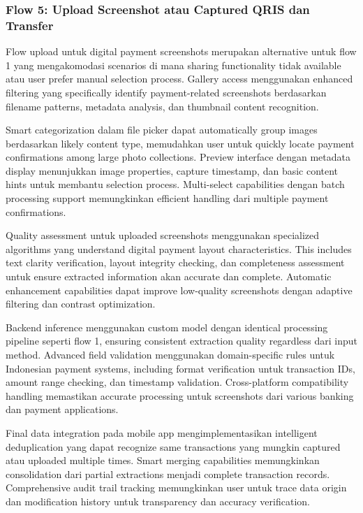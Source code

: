 \subsubsection{Flow 5: Upload Screenshot atau Captured QRIS dan Transfer}
\label{subsubsec:flow-upload-digital}

Flow upload untuk digital payment screenshots merupakan alternative untuk flow 1 yang mengakomodasi scenarios di mana sharing functionality tidak available atau user prefer manual selection process. Gallery access menggunakan enhanced filtering yang specifically identify payment-related screenshots berdasarkan filename patterns, metadata analysis, dan thumbnail content recognition.

Smart categorization dalam file picker dapat automatically group images berdasarkan likely content type, memudahkan user untuk quickly locate payment confirmations among large photo collections. Preview interface dengan metadata display menunjukkan image properties, capture timestamp, dan basic content hints untuk membantu selection process. Multi-select capabilities dengan batch processing support memungkinkan efficient handling dari multiple payment confirmations.

Quality assessment untuk uploaded screenshots menggunakan specialized algorithms yang understand digital payment layout characteristics. This includes text clarity verification, layout integrity checking, dan completeness assessment untuk ensure extracted information akan accurate dan complete. Automatic enhancement capabilities dapat improve low-quality screenshots dengan adaptive filtering dan contrast optimization.

Backend inference menggunakan custom model dengan identical processing pipeline seperti flow 1, ensuring consistent extraction quality regardless dari input method. Advanced field validation menggunakan domain-specific rules untuk Indonesian payment systems, including format verification untuk transaction IDs, amount range checking, dan timestamp validation. Cross-platform compatibility handling memastikan accurate processing untuk screenshots dari various banking dan payment applications.

Final data integration pada mobile app mengimplementasikan intelligent deduplication yang dapat recognize same transactions yang mungkin captured atau uploaded multiple times. Smart merging capabilities memungkinkan consolidation dari partial extractions menjadi complete transaction records. Comprehensive audit trail tracking memungkinkan user untuk trace data origin dan modification history untuk transparency dan accuracy verification.
